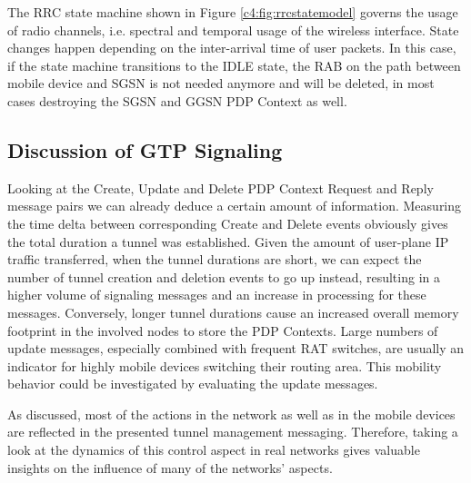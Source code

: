 The \ac{RRC} state machine shown in Figure \ref{c4:fig:rrcstatemodel} governs the usage of radio channels, i.e. spectral and temporal usage of the wireless interface. State changes happen depending on the inter-arrival time of user packets. In this case, if the state machine transitions to the IDLE state, the \ac{RAB} on the path between mobile device and \ac{SGSN} is not needed anymore and will be deleted, in most cases destroying the SGSN and GGSN PDP Context as well.




\subsection{Discussion of GTP Signaling}

Looking at the Create, Update and Delete PDP Context Request and Reply message pairs we can already deduce a certain amount of information. Measuring the time delta between corresponding Create and Delete events obviously gives the total duration a tunnel was established. Given the amount of user-plane IP traffic transferred, when the tunnel durations are short, we can expect the number of tunnel creation and deletion events to go up instead, resulting in a higher volume of signaling messages and an increase in processing for these messages. Conversely, longer tunnel durations cause an increased overall memory footprint in the involved nodes to store the \ac{PDP} Contexts. Large numbers of update messages, especially combined with frequent \ac{RAT} switches, are usually an indicator for highly mobile devices switching their routing area. This mobility behavior could be investigated by evaluating the update messages.

As discussed, most of the actions in the network as well as in the mobile devices are reflected in the presented tunnel management messaging. Therefore, taking a look at the dynamics of this control aspect in real networks gives valuable insights on the influence of many of the networks' aspects.





